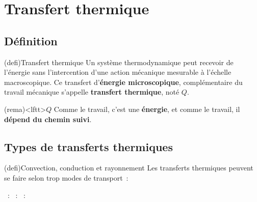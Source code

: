 \documentclass[../../main/main.tex]{subfiles}
\begin{document}
\section{Transfert thermique}
\label{sec:transtherm}
\subsection{Définition}
\begin{tcb*}(defi){Transfert thermique}
	Un système thermodynamique peut recevoir de l'énergie sans l'intercention
	d'une action mécanique mesurable à l'échelle macroscopique. Ce transfert
	d'\textbf{énergie microscopique}, complémentaire du travail mécanique s'appelle
	\textbf{transfert thermique}, noté $Q$.
\end{tcb*}

\begin{tcb}(rema)<lftt>{$Q$}
	Comme le travail, c'est une \textbf{énergie}, et comme le travail, il
	\textbf{dépend du chemin suivi}.
\end{tcb}
\subsection{Types de transferts thermiques}
\begin{tcb}(defi){Convection, conduction et rayonnement}
	Les transferts thermiques peuvent se faire selon trop modes de transport~:
	\begin{itemize}
		~: 
		~: 
		~: 
	\end{itemize}
\end{tcb}
\end{document}
